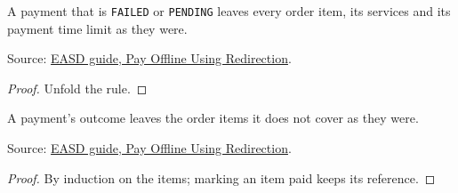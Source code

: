 \begin{theorem}
  \label{thm:payment-outcome-unsuccessful}
  A payment that is \texttt{FAILED} or \texttt{PENDING} leaves every order
  item, its services and its payment time limit as they were.

  Source: \href{https://standards.atlassian.net/wiki/spaces/EASD/pages/574455927/Pay+Offline+Using+Redirection}{EASD guide, Pay Offline Using Redirection}.
\end{theorem}
\begin{proof}
  Unfold the rule.
\end{proof}

\begin{theorem}
  \label{thm:payment-outcome-uncovered}
  A payment's outcome leaves the order items it does not cover as they were.

  Source: \href{https://standards.atlassian.net/wiki/spaces/EASD/pages/574455927/Pay+Offline+Using+Redirection}{EASD guide, Pay Offline Using Redirection}.
\end{theorem}
\begin{proof}
  By induction on the items; marking an item paid keeps its reference.
\end{proof}

